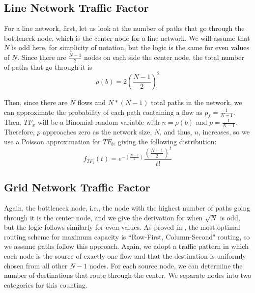 \subsection{Line Network Traffic Factor}

For a line network, first, let us look at the number of paths that go through the bottleneck node, which is the center node for a line network.  We will assume that $N$ is odd here, for simplicity of notation, but the logic is the same for even values of $N$.  Since there are $\frac{N-1}{2}$ nodes on each side the center node, the total number of paths that go through it is
\begin{equation*}
	\rho(b) = 2(\frac{N-1}{2})^2
\end{equation*}

Then, since there are $N$ flows and $N*(N-1)$ total paths in the network, we can approximate the probability of each path containing a flow as $p_f = \frac{1}{N-1}$.  Then, $TF_x$ will be a Binomial random variable with $n=\rho(b)$ and $p=\frac{1}{N-1}$.  Therefore, $p$ approaches zero as the network size, $N$, and thus, $n$, increases, so we use a Poisson approximation for $TF_b$, giving the following distribution:  
\begin{equation*}
	f_{TF_b}(t) = e^{-(\frac{N-1}{2})}\frac{(\frac{N-1}{2})^{t}}{t!}
\end{equation*} 

\subsection{Grid Network Traffic Factor}

Again, the bottleneck node, i.e., the node with the highest number of paths going through it is the center node, and we give the derivation for when $\sqrt{N}$ is odd, but the logic follows similarly for even values.  As proved in \cite{lattice_nets_cap_opt_routing}, the most optimal routing scheme for maximum capacity is ``Row-First, Column-Second" routing, so we assume paths follow this approach.  Again, we adopt a traffic pattern in which each node is the source of exactly one flow and that the destination is uniformly chosen from all other $N-1$ nodes.  
For each source node, we can determine the number of destinations that route through the center.  We separate nodes into two categories for this counting.


